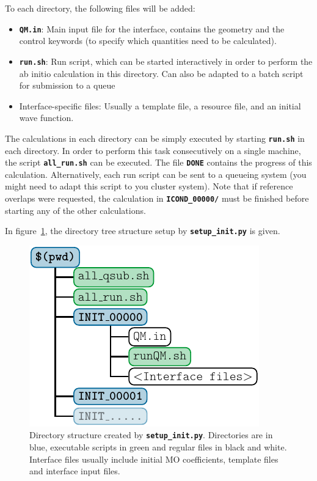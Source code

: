 \documentclass[a4paper,10pt,DIV=15,openany,twoside=false]{scrbook}
\newcommand{\ttt}[1]{\textbf{\texttt{#1}}}
\begin{document}
To each directory, the following files will be added:
\begin{itemize}
  \item \ttt{QM.in}: Main input file for the interface, contains the geometry and the control keywords (to specify which quantities need to be calculated). 
  \item \ttt{run.sh}: Run script, which can be started interactively in order to perform the ab initio calculation in this directory. Can also be adapted to a batch script for submission to a queue 
  \item Interface-specific files: Usually a template file, a resource file, and an initial wave function.
\end{itemize}

The calculations in each directory can be simply executed by starting \ttt{run.sh} in each directory. In order to perform this task consecutively on a single machine, the script \ttt{all\_run.sh} can be executed. The file \ttt{DONE} contains the progress of this calculation.
Alternatively, each run script can be sent to a queueing system (you might need to adapt this script to you cluster system).
Note that if reference overlaps were requested, the calculation in \ttt{ICOND\_00000/} must be finished before starting any of the other calculations.

In figure~\ref{fig:dirs_init}, the directory tree structure setup by \ttt{setup\_init.py} is given.

\begin{figure}
  \centering
  \includegraphics[scale=1]{img/dirs_init/dirs_init.pdf}
  \caption{Directory structure created by \ttt{setup\_init.py}. Directories are in blue, executable scripts in green and regular files in black and white. Interface files usually include initial MO coefficients, template files and interface input files.}
  \label{fig:dirs_init}
\end{figure}
\end{document}
